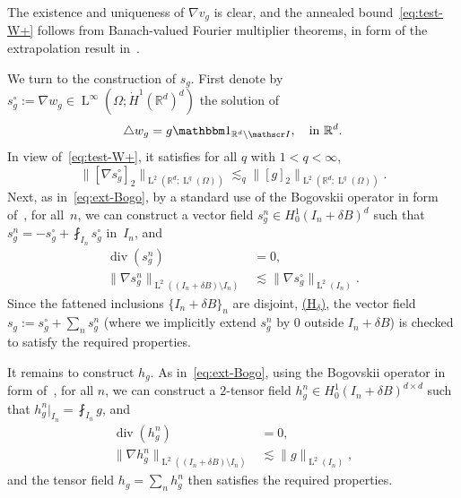 \documentclass[10pt]{amsart}
\let\mathcal\mathscr
\newcommand{\Hd}{\hyperref[Hd]{\textup{(H$_\delta$)}}\xspace}
\let\mathds\mathbbm
\theoremstyle{plain}
\theoremstyle{definition}
\newcommand{\R}{\mathbb R}
\newcommand{\Ic}{\mathcal I}
\newcommand{\Ld}{\operatorname{L}}
\newcommand{\Div}{{\operatorname{div}}}
\begin{document}
The existence and uniqueness of $\nabla v_g$ is clear, and the annealed bound~\eqref{eq:test-W+} follows from Banach-valued Fourier multiplier theorems, \eg in form of the extrapolation result in~\cite[Th.\,3.15]{Kunstmann-Weis-04}.

We turn to the construction of $s_g$.
First denote by $s_g^\circ:=\nabla w_g\in\Ld^\infty(\Omega;\dot H^1(\R^d)^d)$ the solution of
\[\triangle w_g=g\mathds1_{\R^d\setminus\Ic},\quad\text{in $\R^d$}.\]
In view of~\eqref{eq:test-W+}, it satisfies for all $q$ with $1<q<\infty$,
\begin{equation*}
\|[\nabla s_g^\circ]_2\|_{\Ld^2(\R^d;\Ld^q(\Omega))}\lesssim_q \|[g]_2\|_{\Ld^2(\R^d;\Ld^q(\Omega))}.
\end{equation*}
Next, as in~\eqref{eq:ext-Bogo}, by a standard use of the Bogovskii operator in form of~\hbox{\cite[\!Th.\,III.3.1]{Galdi}}, for all~$n$, we can construct a vector field $s_g^n\in H^1_0(I_n+\delta B)^d$ such that $s_g^n=-s_g^\circ+\fint_{I_n}s_g^\circ$ in~$I_n$, and
\begin{align*}
\Div (s_g^n) &= 0,\\
\|\nabla s_g^n\|_{\Ld^2((I_n+\delta B)\setminus I_n)}&\lesssim \|\nabla s_g^\circ\|_{\Ld^2(I_n)}.
\end{align*}
Since the fattened inclusions $\{I_n+\delta B\}_n$ are disjoint, \cf \Hd, the vector field $s_g:=s_g^\circ+\sum_ns_g^n$ (where we implicitly extend $s_g^n$ by $0$ outside $I_n+\delta B$) is checked to satisfy the required properties.

It remains to construct $h_g$.
As in~\eqref{eq:ext-Bogo}, using the Bogovskii operator in form of~\cite[Th.\,III.3.1]{Galdi}, for all $n$, we can construct a $2$-tensor field $h_g^n \in H^1_0(I_n+\delta B)^{d\times d}$ such that $h_g^n|_{I_n}=\fint_{I_n}g$, and
\begin{align*}
\Div (h_g^n)&=0,\\
\|\nabla h_g^n\|_{\Ld^2((I_n+\delta B)\setminus I_n)}&\lesssim \|g\|_{\Ld^2(I_n)},
\end{align*}
and the tensor field $h_g=\sum_nh_g^n$ then satisfies the required properties.
\end{document}

